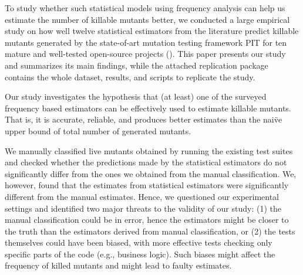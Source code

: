 \documentclass[sigconf,review,anonymous]{acmart}
\newcommand{\estimatorCount}{twelve\xspace}
\newcommand{\projectCount}{ten\xspace}
\newcommand{\PIT}{\textsc{PIT}\xspace}
\begin{document}
%
%
%
To study whether such statistical models using frequency analysis can help us estimate the number
of killable mutants better, we conducted a large empirical study on how well
\estimatorCount statistical estimators from the literature predict killable mutants
generated by the state-of-art mutation testing framework \PIT\cite{pit}
for \projectCount  mature and well-tested open-source projects (). %
This paper presents our study and summarizes its main findings, while the attached
replication package~\cite{replication-package} contains the whole dataset, results, 
and scripts to replicate the study.

\begin{tcolorbox}[boxrule=0.5pt, arc=4pt, boxsep=0pt, width=\columnwidth]
Our study investigates the hypothesis that (at least)
one of the surveyed frequency based estimators can be effectively used to
estimate killable mutants.
That is, it is accurate, reliable, and
produces better estimates than the nai\"ve upper bound of total
number of generated mutants.
\end{tcolorbox}

We manually classified live mutants obtained by running the
existing test suites
and checked whether the predictions made by the statistical estimators do not significantly
differ from the ones we obtained from the manual classification.
We, however, found that
the estimates from statistical estimators
were significantly different from the manual estimates.
Hence, we questioned our experimental settings
and identified two major threats to the validity of our study:
(1) the manual classification could be in error, hence the
estimators might be closer to the truth than the estimators derived from manual
classification, or
(2) the tests themselves could have been biased, with more effective tests checking
 only specific parts of the code (e.g., business logic).
Such biases might affect the frequency of killed mutants and might lead to faulty estimates.
\end{document}
